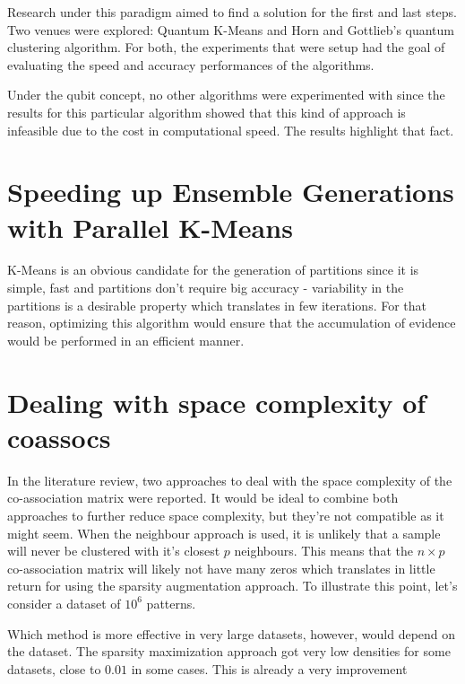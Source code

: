 Research under this paradigm aimed to find a solution for the first and last steps. Two venues were explored: Quantum K-Means and Horn and Gottlieb's quantum clustering algorithm.
For both, the experiments that were setup had the goal of evaluating the speed and accuracy performances of the algorithms.

Under the qubit concept, no other algorithms were experimented with since the results for this particular algorithm showed that this kind of approach is infeasible due to the cost in computational speed. The results highlight that fact.



\section{Speeding up Ensemble Generations with Parallel K-Means}
K-Means is an obvious candidate for the generation of partitions since it is simple, fast and partitions don't require big accuracy - variability in the partitions is a desirable property which translates in few iterations. For that reason, optimizing this algorithm would ensure that the accumulation of evidence would be performed in an efficient manner.




\section{Dealing with space complexity of coassocs}
In the literature review, two approaches to deal with the space complexity of the co-association matrix were reported. It would be ideal to combine both approaches to further reduce space complexity, but they're not compatible as it might seem. When the neighbour approach is used, it is unlikely that a sample will never be clustered with it's closest $p$ neighbours. This means that the $n \times p$ co-association matrix will likely not have many zeros which translates in little return for using the sparsity augmentation approach. To illustrate this point, let's consider a dataset of $10^6$ patterns. 


Which method is more effective in very large datasets, however, would depend on the dataset. The sparsity maximization approach got very low densities for some datasets, close to $0.01$ in some cases. This is already a very improvement


